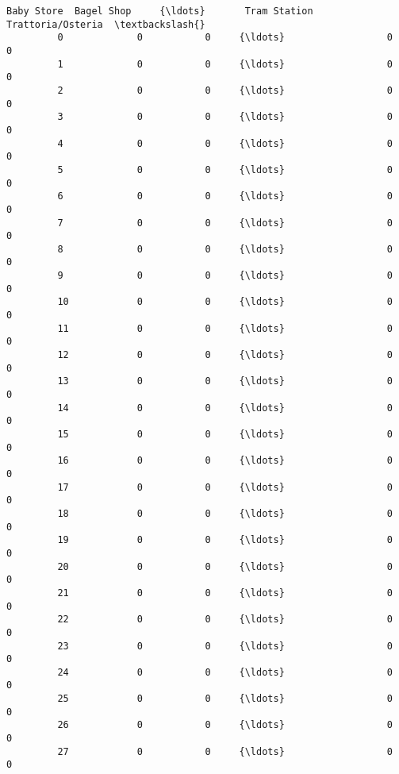 \documentclass[11pt]{article}
\begin{document}
\begin{Verbatim}[commandchars=\\\{\}]
              Baby Store  Bagel Shop     {\ldots}       Tram Station  Trattoria/Osteria  \textbackslash{}
         0             0           0     {\ldots}                  0                  0   
         1             0           0     {\ldots}                  0                  0   
         2             0           0     {\ldots}                  0                  0   
         3             0           0     {\ldots}                  0                  0   
         4             0           0     {\ldots}                  0                  0   
         5             0           0     {\ldots}                  0                  0   
         6             0           0     {\ldots}                  0                  0   
         7             0           0     {\ldots}                  0                  0   
         8             0           0     {\ldots}                  0                  0   
         9             0           0     {\ldots}                  0                  0   
         10            0           0     {\ldots}                  0                  0   
         11            0           0     {\ldots}                  0                  0   
         12            0           0     {\ldots}                  0                  0   
         13            0           0     {\ldots}                  0                  0   
         14            0           0     {\ldots}                  0                  0   
         15            0           0     {\ldots}                  0                  0   
         16            0           0     {\ldots}                  0                  0   
         17            0           0     {\ldots}                  0                  0   
         18            0           0     {\ldots}                  0                  0   
         19            0           0     {\ldots}                  0                  0   
         20            0           0     {\ldots}                  0                  0   
         21            0           0     {\ldots}                  0                  0   
         22            0           0     {\ldots}                  0                  0   
         23            0           0     {\ldots}                  0                  0   
         24            0           0     {\ldots}                  0                  0   
         25            0           0     {\ldots}                  0                  0   
         26            0           0     {\ldots}                  0                  0   
         27            0           0     {\ldots}                  0                  0   

\end{Verbatim}
\end{document}
